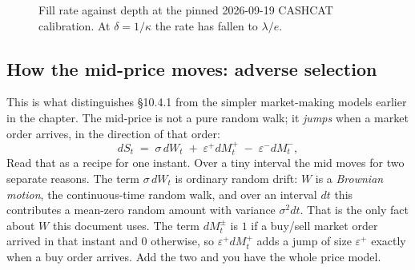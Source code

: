 \documentclass[11pt,a4paper]{article}
\begin{document}
\begin{figure}[htbp]
\centering
{}
\caption{Fill rate against depth at the pinned 2026-09-19 CASHCAT calibration. At
$\delta = 1/\kappa$ the rate has fallen to $\lambda/e$.}
\end{figure}

\subsection{How the mid-price moves: adverse selection}

This is what distinguishes \S10.4.1 from the simpler market-making models earlier
in the chapter. The mid-price is not a pure random walk; it \emph{jumps} when a
market order arrives, in the direction of that order:
\begin{equation}
  dS_t \;=\; \sigma\, dW_t \;+\; \varepsilon^{+} dM^{+}_t \;-\; \varepsilon^{-} dM^{-}_t,
  \tag{10.22}
  \label{eq:1022}
\end{equation}
Read that as a recipe for one instant. Over a tiny interval the mid moves for two
separate reasons. The term $\sigma\,dW_t$ is ordinary random drift: $W$ is a
\emph{Brownian motion}, the continuous-time random walk, and over an interval
$dt$ this contributes a mean-zero random amount with variance $\sigma^{2}dt$.
That is the only fact about $W$ this document uses. The term $dM^{\pm}_t$ is $1$
if a buy/sell market order arrived in that instant and $0$ otherwise, so
$\varepsilon^{+}dM^{+}_t$ adds a jump of size $\varepsilon^{+}$ exactly when a
buy order arrives. Add the two and you have the whole price model.
\end{document}
